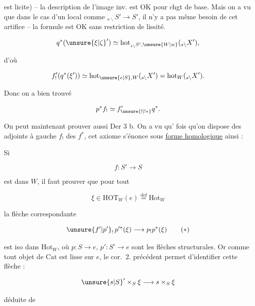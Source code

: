 
est licite) --  la description de l'image inv. est OK pour \uline{} chgt de base. Mais on a vu que dans le cas d'un  local comme $ {}_{s\backslash}S'\longrightarrow S'$, il n'y a pas même besoin de cet artifice -- la formule est OK sans restriction de lissité.


\[
 q^*(\unsure{\xi|\zeta}')\simeq\mathrm{hot}_{{}_{s\backslash}S',\unsure{W|w}}({}_{s\backslash}X'),
\]

d'où

\[
 f'_!(q^*(\xi'))\simeq\mathrm{hot}_{\unsure{e|S},W}({}_{s\backslash}X')=\mathrm{hot}_W({}_{s\backslash}X').
\]

Donc on a bien trouvé

\[
 p^*f_!\simeq f'_{\unsure{!|!*}}q^*.
\]

On peut maintenant prouver aussi Der 3 b. On a vu qu'  fois qu'on dispose des adjoints à gauche $f_!$ des $f^*$, cet axiome s'énonce sous \uline{forme homologique} ainsi :

Si

\[
 f:S'\longrightarrow S
\]

est dans $W$, il faut prouver que pour tout

\[
 \xi\in\mathrm{HOT}_W(e)\overset{\mathrm{def}}{=}\mathrm{Hot}_W
\]

la flèche correspondante

\[
 \unsure{f'|p'}_!\,p'^*(\xi)\longrightarrow p_!p^*(\xi)\tag*{$(*)$}
\]

est iso dans $\mathrm{Hot}_W$, où $p:S\longrightarrow e$, $p':S'\longrightarrow e$ sont les flèches structurales. Or comme tout objet de $\mathrm{Cat}$ est lisse sur $e$, le cor.~2. précédent permet d'identifier cette flèche  :

\[
 \unsure{s|S}'\times_S\xi\longrightarrow s\times_S\xi
\]


déduite de


